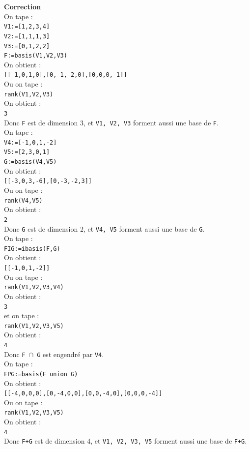 \documentclass[a4paper,11pt]{book}
\begin{document}
{\bf Correction}\\
On tape :\\
{\tt V1:=[1,2,3,4]}\\
{\tt V2:=[1,1,1,3]}\\
{\tt V3:=[0,1,2,2]}\\
{\tt F:=basis(V1,V2,V3)}\\
On obtient :\\
{\tt [[-1,0,1,0],[0,-1,-2,0],[0,0,0,-1]]}\\
Ou on tape :\\
{\tt rank(V1,V2,V3)}\\
On obtient :\\
{\tt 3}\\
Donc {\tt F} est de dimension 3, et {\tt V1, V2, V3} forment aussi une 
base de {\tt F}.\\
On tape :\\
{\tt V4:=[-1,0,1,-2]}\\
{\tt V5:=[2,3,0,1]}\\
{\tt G:=basis(V4,V5)}\\
On obtient :\\
{\tt [[-3,0,3,-6],[0,-3,-2,3]]}\\
Ou on tape :\\
{\tt rank(V4,V5)}\\
On obtient :\\
{\tt 2}\\
Donc {\tt G} est de dimension 2, et {\tt V4, V5} forment aussi une 
base de {\tt G}.\\
On tape :\\
{\tt FIG:=ibasis(F,G)}\\
On obtient :\\
{\tt [[-1,0,1,-2]]}\\
Ou on tape :\\
{\tt rank(V1,V2,V3,V4)}\\
On obtient :\\
{\tt 3}\\
et on tape :\\
{\tt rank(V1,V2,V3,V5)}\\
On obtient :\\
{\tt 4}\\
Donc {\tt F $\cap$ G} est engendr\'e par {\tt V4}.\\ 
On tape :\\
{\tt FPG:=basis(F union G)}\\
On obtient :\\
{\tt [[-4,0,0,0],[0,-4,0,0],[0,0,-4,0],[0,0,0,-4]]}\\
Ou on tape :\\
{\tt rank(V1,V2,V3,V5)}\\
On obtient :\\
{\tt 4}\\
Donc {\tt F+G} est de dimension 4, et {\tt V1, V2, V3, V5} forment aussi une 
base de {\tt F+G}.\\
\end{document}
